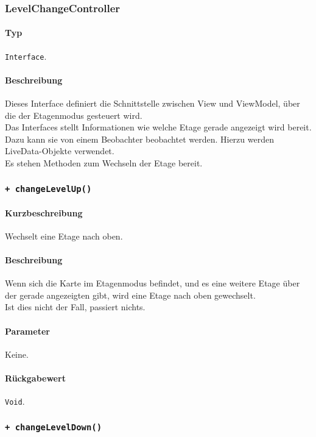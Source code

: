 \subsubsection{LevelChangeController}\label{App_Map_ViewModel_LevelChangeController}
\paragraph*{Typ}
\texttt{Interface}.
\paragraph*{Beschreibung}
Dieses Interface definiert die Schnittstelle zwischen View und ViewModel, über die 
der Etagenmodus gesteuert wird.\\
Das Interfaces stellt Informationen wie welche Etage gerade angezeigt wird bereit.
Dazu kann sie von einem Beobachter beobachtet werden. Hierzu werden LiveData-Objekte verwendet.\\
Es stehen Methoden zum Wechseln der Etage bereit.\\

\subsubsection*{\texttt{+ changeLevelUp()}}\label{App_Map_ViewModel_changeLevelUp}%
\paragraph*{Kurzbeschreibung}
Wechselt eine Etage nach oben.
\paragraph*{Beschreibung}
Wenn sich die Karte im Etagenmodus befindet, und es eine weitere Etage über der gerade 
angezeigten gibt, wird eine Etage nach oben gewechselt.\\
Ist dies nicht der Fall, passiert nichts.
\paragraph*{Parameter}
Keine.
\paragraph*{Rückgabewert}
\texttt{Void}.

\subsubsection*{\texttt{+ changeLevelDown()}}\label{App_Map_ViewModel_changeLevelDown}%
